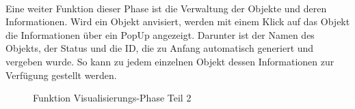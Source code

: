 \\ 
\linebreak
Eine weiter Funktion dieser Phase ist die Verwaltung der Objekte und deren Informationen. Wird ein Objekt anvisiert, werden mit einem Klick auf das Objekt 
die Informationen über ein PopUp angezeigt. Darunter ist der Namen des Objekts, der Status und die ID, die zu Anfang automatisch generiert 
und vergeben wurde. So kann zu jedem einzelnen Objekt dessen Informationen zur Verfügung gestellt werden. 
\pagebreak
\begin{figure}[hbt!]
    \centering
    \caption{Funktion Visualisierungs-Phase Teil 2}
    \label{pic:showdatatoobj}
\end{figure}
